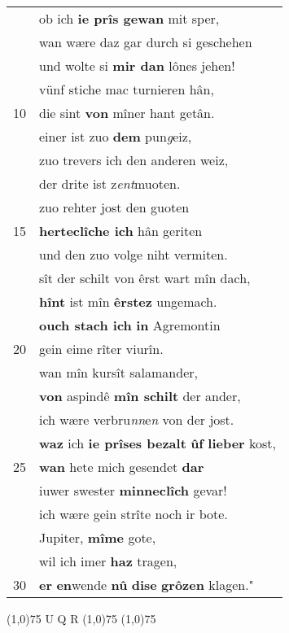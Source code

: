 \documentclass[8pt,a4paper,notitlepage]{article}
\begin{document}
\begin{table}[ht]
\begin{minipage}[t]{0.5\linewidth}
\begin{tabular}{rl}
 & ob ich \textbf{ie prîs gewan} mit sper,\\ 
 & wan wære daz gar durch si geschehen\\ 
 & und wolte si \textbf{mir dan} lônes jehen!\\ 
 & vünf stiche mac turnieren hân,\\ 
10 & die sint \textbf{von} mîner hant getân.\\ 
 & einer ist zuo \textbf{dem} pun\textit{g}eiz,\\ 
 & zuo trevers ich den anderen weiz,\\ 
 & der drite ist z\textit{ent}muoten.\\ 
 & zuo rehter jost den guoten\\ 
15 & \textbf{herteclîche ich} hân geriten\\ 
 & und den zuo volge niht vermiten.\\ 
 & sît der schilt von êrst wart mîn dach,\\ 
 & \textbf{hînt} ist mîn \textbf{êrstez} ungemach.\\ 
 & \textbf{ouch stach ich} \textbf{in} Agremontin\\ 
20 & gein eime rîter viurîn.\\ 
 & wan mîn kursît salamander,\\ 
 & \textbf{von} aspindê \textbf{mîn schilt} der ander,\\ 
 & ich wære verbru\textit{nn}e\textit{n} von der jost.\\ 
 & \textbf{waz} ich \textbf{ie prîses bezalt} \textbf{ûf} \textbf{lieber} kost,\\ 
25 & \textbf{wan} hete mich gesendet \textbf{dar}\\ 
 & iuwer swester \textbf{minneclîch} gevar!\\ 
 & ich wære gein strîte noch ir bote.\\ 
 & Jupiter, \textbf{mîme} gote,\\ 
 & wil ich imer \textbf{haz} tragen,\\ 
30 & \textbf{er} \textbf{en}wende \textbf{nû} \textbf{dise} \textbf{grôzen} klagen."\\ 
\end{tabular}
\scriptsize
\line(1,0){75} \newline
U Q R \newline
\line(1,0){75} \newline
\newline
\line(1,0){75} \newline

\end{minipage}
\end{table}
\end{document}
